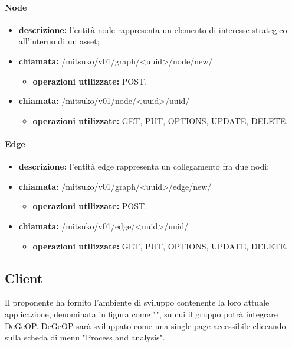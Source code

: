 \paragraph{Node}
\begin{itemize}
\item \textbf{descrizione:} l'entità node rappresenta un elemento di interesse strategico all'interno di un asset;
\item \textbf{chiamata:} /mitsuko/v01/graph/<uuid>/node/new/
\begin{itemize}\item \textbf{operazioni utilizzate:} POST.\end{itemize}
\item \textbf{chiamata:} /mitsuko/v01/node/<uuid>/uuid/
\begin{itemize}\item \textbf{operazioni utilizzate:} GET, PUT, OPTIONS, UPDATE, DELETE.\end{itemize}
\end{itemize}

\paragraph{Edge}
\begin{itemize}
\item \textbf{descrizione:} l'entità edge rappresenta un collegamento fra due nodi;
\item \textbf{chiamata:} /mitsuko/v01/graph/<uuid>/edge/new/
\begin{itemize}\item \textbf{operazioni utilizzate:} POST.\end{itemize}
\item \textbf{chiamata:} /mitsuko/v01/edge/<uuid>/uuid/
\begin{itemize}\item \textbf{operazioni utilizzate:} GET, PUT, OPTIONS, UPDATE, DELETE.\end{itemize}
\end{itemize}

\newpage
\subsection{Client}
Il proponente ha fornito l'ambiente di sviluppo contenente la loro attuale applicazione, denominata in figura come "\riskapp", su cui il gruppo potrà integrare DeGeOP. DeGeOP sarà sviluppato come una single-page accessibile cliccando sulla scheda di menu "Process and analysis".

